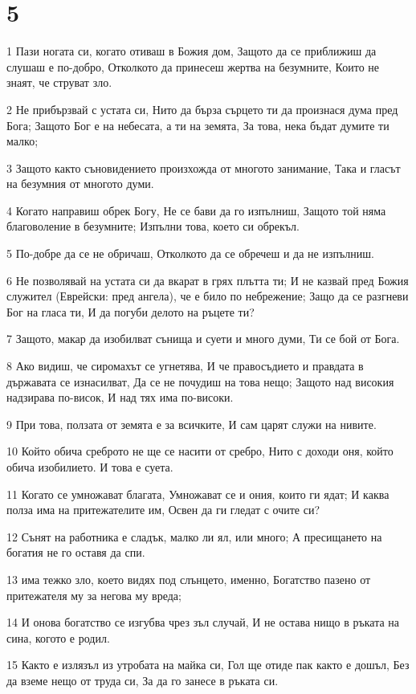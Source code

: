 \chapter{5}

\par 1 Пази ногата си, когато отиваш в Божия дом, Защото да се приближиш да слушаш е по-добро, Отколкото да принесеш жертва на безумните, Които не знаят, че струват зло.
\par 2 Не прибързвай с устата си, Нито да бърза сърцето ти да произнася дума пред Бога; Защото Бог е на небесата, а ти на земята, За това, нека бъдат думите ти малко;
\par 3 Защото както съновидението произхожда от многото занимание, Така и гласът на безумния от многото думи.
\par 4 Когато направиш обрек Богу, Не се бави да го изпълниш, Защото той няма благоволение в безумните; Изпълни това, което си обрекъл.
\par 5 По-добре да се не обричаш, Отколкото да се обречеш и  да не изпълниш.
\par 6 Не позволявай на устата си да вкарат в грях плътта ти; И не казвай пред Божия служител (Еврейски: пред ангела), че е било по небрежение; Защо да се разгневи Бог на гласа ти, И да погуби делото на ръцете ти?
\par 7 Защото, макар да изобилват сънища и суети и много думи, Ти се бой от Бога.
\par 8 Ако видиш, че сиромахът се угнетява, И че правосъдието и правдата в държавата се изнасилват, Да се не почудиш на това нещо; Защото над високия надзирава по-висок, И над тях има по-високи.
\par 9 При това, ползата от земята е за всичките, И сам царят служи на нивите.
\par 10 Който обича среброто не ще се насити от сребро, Нито с доходи оня, който обича изобилието. И това е суета.
\par 11 Когато се умножават благата, Умножават се и ония, които ги ядат; И каква полза има на  притежателите им, Освен да ги гледат с очите си?
\par 12 Сънят на работника е сладък, малко ли ял, или много; А пресищането на богатия не го оставя да спи.
\par 13 има тежко зло, което видях под слънцето, именно, Богатство пазено от притежателя му за негова му вреда;
\par 14 И онова богатство се изгубва чрез зъл случай, И не остава нищо в ръката на сина, когото е родил.
\par 15 Както е излязъл из утробата на майка си, Гол ще отиде пак както е дошъл, Без да вземе нещо от труда си, За да го занесе в ръката си.
